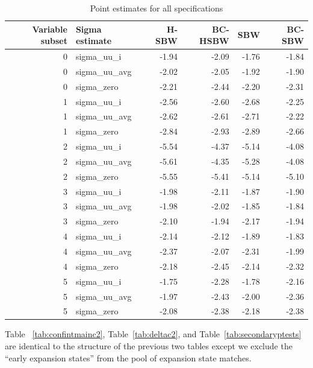 \documentclass[aoas]{imsart}
\theoremstyle{plain}
\theoremstyle{remark}
\begin{document}
\begin{appendix}
\begin{table}[ht]
\centering
\caption{Point estimates for all specifications}
\label{tab:ptests}
\begin{tabular}{rlrrrr}
  \hline
Variable subset & Sigma estimate & H-SBW & BC-HSBW & SBW & BC-SBW \\ 
  \hline
0 & sigma\_uu\_i & -1.94 & -2.09 & -1.76 & -1.84 \\ 
  0 & sigma\_uu\_avg & -2.02 & -2.05 & -1.92 & -1.90 \\ 
  0 & sigma\_zero & -2.21 & -2.44 & -2.20 & -2.31 \\ 
  1 & sigma\_uu\_i & -2.56 & -2.60 & -2.68 & -2.25 \\ 
  1 & sigma\_uu\_avg & -2.62 & -2.61 & -2.71 & -2.22 \\ 
  1 & sigma\_zero & -2.84 & -2.93 & -2.89 & -2.66 \\ 
  2 & sigma\_uu\_i & -5.54 & -4.37 & -5.14 & -4.08 \\ 
  2 & sigma\_uu\_avg & -5.61 & -4.35 & -5.28 & -4.08 \\ 
  2 & sigma\_zero & -5.55 & -5.41 & -5.14 & -5.10 \\ 
  3 & sigma\_uu\_i & -1.98 & -2.11 & -1.87 & -1.90 \\ 
  3 & sigma\_uu\_avg & -1.98 & -2.02 & -1.85 & -1.84 \\ 
  3 & sigma\_zero & -2.10 & -1.94 & -2.17 & -1.94 \\ 
  4 & sigma\_uu\_i & -2.14 & -2.12 & -1.89 & -1.83 \\ 
  4 & sigma\_uu\_avg & -2.37 & -2.07 & -2.31 & -1.99 \\ 
  4 & sigma\_zero & -2.18 & -2.45 & -2.14 & -2.32 \\ 
  5 & sigma\_uu\_i & -1.75 & -2.28 & -1.78 & -2.16 \\ 
  5 & sigma\_uu\_avg & -1.97 & -2.43 & -2.00 & -2.36 \\ 
  5 & sigma\_zero & -2.08 & -2.38 & -2.18 & -2.38 \\ 
   \hline
\end{tabular}
\end{table}

Table ~\ref{tab:confintmainc2}, Table~\ref{tab:deltac2}, and Table~\ref{tab:secondaryptests} are identical to the structure of the previous two tables except we exclude the ``early expansion states'' from the pool of expansion state matches. 


\end{appendix}
\end{document}
